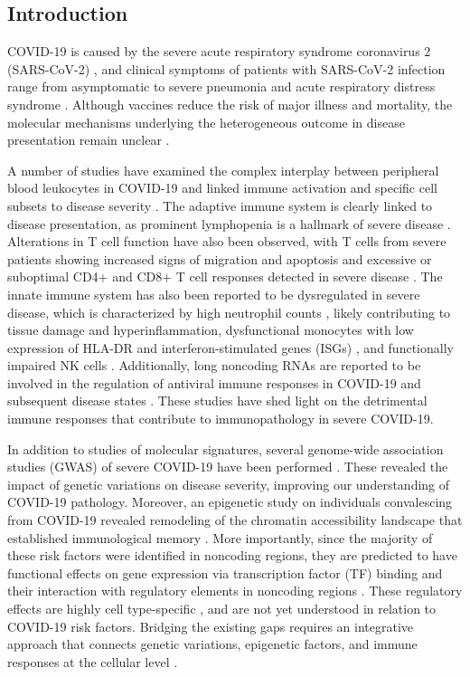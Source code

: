 \documentclass{book}
\begin{document}
\begin{refsection}
\clearpage
\newpage
\section*{Introduction}
COVID-19 is caused by the severe acute respiratory syndrome coronavirus 2 (SARS-CoV-2) \cite{Wu2020A}, and clinical symptoms of patients with SARS-CoV-2 infection range from asymptomatic to severe pneumonia and acute respiratory distress syndrome \cite{Verity2020Estimates}.
Although vaccines reduce the risk of major illness and mortality, the molecular mechanisms underlying the heterogeneous outcome in disease presentation remain unclear \cite{Polack2020Safety}.
 
A number of studies have examined the complex interplay between peripheral blood leukocytes in COVID-19 and linked immune activation and specific cell subsets to disease severity \cite{Schulte2020Severe,Ren2021COVID}.
The adaptive immune system is clearly linked to disease presentation, as prominent lymphopenia is a hallmark of severe disease \cite{Chen2020Clinical}.
Alterations in T cell function have also been observed, with T cells from severe patients showing increased signs of migration and apoptosis \cite{Zhang2020Single} and excessive or suboptimal CD4+ and CD8+ T cell responses detected in severe disease \cite{Chen2020T}.
The innate immune system has also been reported to be dysregulated in severe disease, which is characterized by high neutrophil counts \cite{Reusch2021Neutrophils}, likely contributing to tissue damage and hyperinflammation, dysfunctional monocytes with low expression of HLA-DR and interferon-stimulated genes (ISGs) \cite{Schulte2020Severe}, and functionally impaired NK cells \cite{Krämer2021Early}.
Additionally, long noncoding RNAs are reported to be involved in the regulation of antiviral immune responses in COVID-19 and subsequent disease states \cite{Yang2021Long}.
These studies have shed light on the detrimental immune responses that contribute to immunopathology in severe COVID-19.

In addition to studies of molecular signatures, several genome-wide association studies (GWAS) of severe COVID-19 have been performed \cite{Author2020Genomewide,Pairo2020Genetic,Niemi2021Mapping}.
These revealed the impact of genetic variations on disease severity, improving our understanding of COVID-19 pathology.
Moreover, an epigenetic study on individuals convalescing from COVID-19 revealed remodeling of the chromatin accessibility landscape that established immunological memory \cite{You2021Single}.
More importantly, since the majority of these risk factors were identified in noncoding regions, they are predicted to have functional effects on gene expression via transcription factor (TF) binding and their interaction with regulatory elements in noncoding regions \cite{Gallagher2018The}.
These regulatory effects are highly cell type-specific \cite{Nott2019Brain,Corces2020Single}, and are not yet understood in relation to COVID-19 risk factors.
Bridging the existing gaps requires an integrative approach that connects genetic variations, epigenetic factors, and immune responses at the cellular level \cite{Chu2021Multi}.


\end{refsection}
\end{document}
